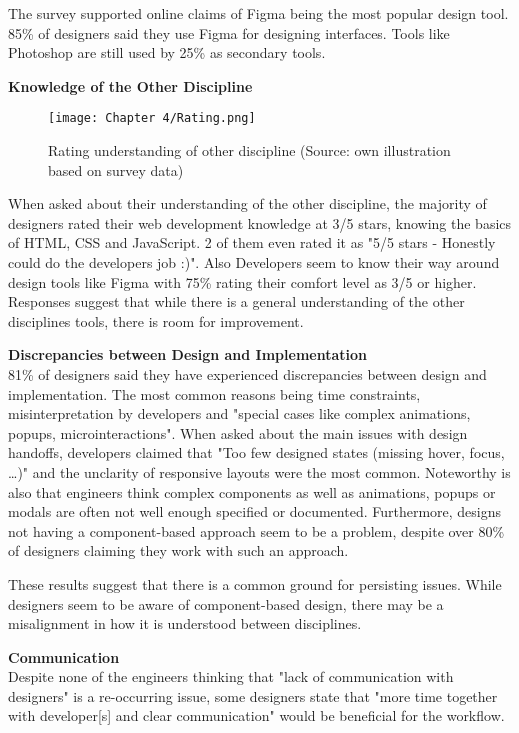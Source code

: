 The survey supported online claims of Figma being the most popular design tool. 85\% of designers
said they use Figma for designing interfaces. Tools like Photoshop are still used by 25\% as
secondary tools.

\textbf{Knowledge of the Other Discipline}\\
\begin{figure}[H]
    \centering
    \texttt{[image: Chapter 4/Rating.png]}
    \caption{Rating understanding of other discipline (Source: own illustration based on survey data)}
\end{figure}
When asked about their understanding of the other discipline, the majority of designers rated their
web development knowledge at 3/5 stars, knowing the basics of HTML, CSS and JavaScript. 2 of
them even rated it as "5/5 stars - Honestly could do the developers job :)". Also Developers seem to
know their way around design tools like Figma with 75\% rating their comfort level as 3/5 or higher.
Responses suggest that while there is a general understanding of the other disciplines tools, there
is room for improvement.

\textbf{Discrepancies between Design and Implementation}\\
81\% of designers said they have experienced discrepancies between design and implementation. The
most common reasons being time constraints, misinterpretation by developers and "special cases like
complex animations, popups, microinteractions". When asked about the main issues with design
handoffs, developers claimed that "Too few designed states (missing hover, focus, \dots)" and
the unclarity of responsive layouts were the most common. Noteworthy is also that engineers think
complex components as well as animations, popups or modals are often not well enough specified or
documented. Furthermore, designs not having a component-based approach seem to be a problem, despite
over 80\% of designers claiming they work with such an approach.

These results suggest that there is a common ground for persisting issues. While designers seem to
be aware of component-based design, there may be a misalignment in how it is understood between
disciplines.

\textbf{Communication}\\
Despite none of the engineers thinking that "lack of communication with designers" is a re-occurring
issue, some designers state that "more time together with developer[s] and clear communication"
would be beneficial for the workflow.

